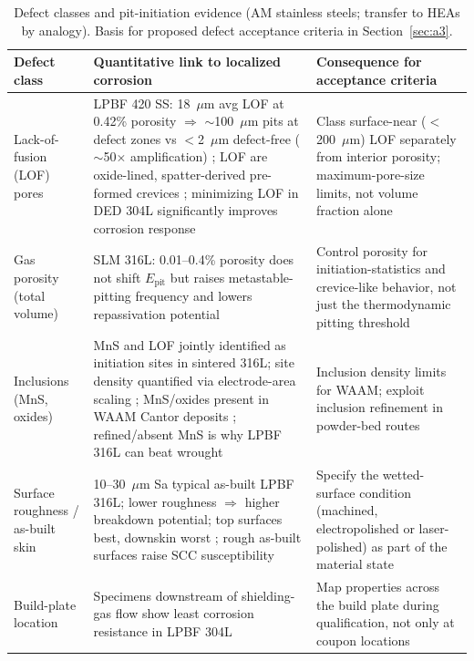 \begin{table}[t]
\centering
\caption{Defect classes and pit-initiation evidence (AM stainless steels; transfer to HEAs by analogy). Basis for proposed defect acceptance criteria in Section~\ref{sec:a3}.}
\label{tab:defectpit}
\footnotesize
\begin{tabularx}{\textwidth}{@{}lXX@{}}
\toprule
Defect class & Quantitative link to localized corrosion & Consequence for acceptance criteria \\
\midrule
Lack-of-fusion (LOF) pores & LPBF 420 SS: 18~$\mu$m avg LOF at 0.42\% porosity $\Rightarrow$ $\sim$100~$\mu$m pits at defect zones vs $<$2~$\mu$m defect-free ($\sim$50$\times$ amplification) \cite{npd_am_review2026}; LOF are oxide-lined, spatter-derived pre-formed crevices \cite{lof2021}; minimizing LOF in DED 304L significantly improves corrosion response \cite{iop2024def304l} & Class surface-near ($<$200~$\mu$m) LOF separately from interior porosity; maximum-pore-size limits, not volume fraction alone \\
Gas porosity (total volume) & SLM 316L: 0.01--0.4\% porosity does not shift $E_{\mathrm{pit}}$ but raises metastable-pitting frequency and lowers repassivation potential \cite{iop2024def304l} & Control porosity for initiation-statistics and crevice-like behavior, not just the thermodynamic pitting threshold \\
Inclusions (MnS, oxides) & MnS and LOF jointly identified as initiation sites in sintered 316L; site density quantified via electrode-area scaling \cite{npj_sintered2024}; MnS/oxides present in WAAM Cantor deposits \cite{andersson2026waam}; refined/absent MnS is why LPBF 316L can beat wrought \cite{jom_pitting_review2022} & Inclusion density limits for WAAM; exploit inclusion refinement in powder-bed routes \\
Surface roughness / as-built skin & 10--30~$\mu$m Sa typical as-built LPBF 316L; lower roughness $\Rightarrow$ higher breakdown potential; top surfaces best, downskin worst \cite{jom_pitting_review2022}; rough as-built surfaces raise SCC susceptibility \cite{lpbf_316l_scc2022} & Specify the wetted-surface condition (machined, electropolished or laser-polished) as part of the material state \\
Build-plate location & Specimens downstream of shielding-gas flow show least corrosion resistance in LPBF 304L \cite{iop2024def304l} & Map properties across the build plate during qualification, not only at coupon locations \\
\bottomrule
\end{tabularx}
\end{table}
